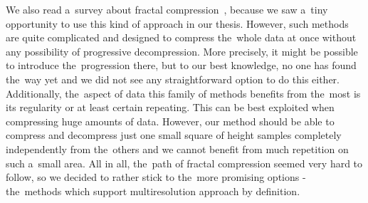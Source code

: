 We also read a~survey about fractal compression~\cite{fractal}, because we saw a~tiny opportunity to use this kind of approach in our thesis. However, such methods are quite complicated and designed to compress the~whole data at once without any possibility of progressive decompression. More precisely, it might be possible to introduce the~progression there, but to our best knowledge, no one has found the~way yet and we did not see any straightforward option to do this either. Additionally, the~aspect of data this family of methods benefits from the~most is its regularity or at least certain repeating. This can be best exploited when compressing huge amounts of data. However, our method should be able to compress and decompress just one small square of height samples completely independently from the~others and we cannot benefit from much repetition on such a~small area. All in all, the~path of fractal compression seemed very hard to follow, so we decided to rather stick to the~more promising options - the~methods which support multiresolution approach by definition.

